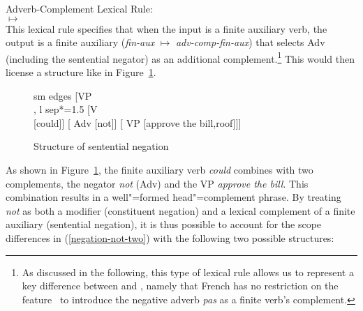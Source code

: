 \documentclass[output=paper
 	        ,biblatex
                ,babelshorthands
                ,newtxmath
                ,draftmode
                ,colorlinks, citecolor=brown
]{langscibook}
\begin{document}
\begin{exe}
\begin{xlist}
\begin{exe}
\begin{xlist}
\ea
Adverb-Complement Lexical Rule:\\
 $\mapsto$\\[2mm]
\hfill{}
\z
%
This lexical rule specifies that when the input is a finite auxiliary verb,
the output is a finite auxiliary (\textit{fin-aux} $\mapsto$ \textit{adv-comp-fin-aux})
that selects Adv (including the sentential negator) as an additional
complement.\footnote{%
As discussed in the following, this type of lexical rule allows us to represent a key difference between  and , namely that French has no restriction on the feature \AUX\ to introduce the negative adverb \emph{pas} as a finite verb’s complement.}  This would then
license a structure like in Figure~\ref{negation-fig:6}.

\begin{figure}
	\begin{forest}
		sm edges
		[VP\\
		, l sep*=1.5
			[V\\
				[could]]
			[ Adv
				[not]]
			[ VP
				[approve the bill,roof]]]
	\end{forest}
\caption{Structure of sentential negation}\label{negation-fig:6}
\end{figure}

As shown in Figure~\ref{negation-fig:6}, the finite auxiliary
verb \textit{could} combines with two complements, the negator
\textit{not} (Adv) and the VP \textit{approve the bill}.
This combination results in a well"=formed head"=complement phrase.
By treating \textit{not} as both a modifier (constituent negation)
and a lexical complement of a finite auxiliary (sentential negation), it is thus possible to
account for the scope differences in (\ref{negation-not-two}) with the
following two possible structures:


\end{xlist}
\end{exe}
\end{xlist}
\end{exe}
\end{document}

